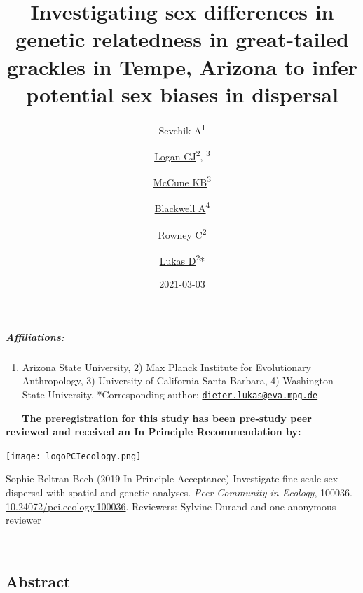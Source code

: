 \documentclass[
]{article}
\title{Investigating sex differences in genetic relatedness in
great-tailed grackles in Tempe, Arizona to infer potential sex biases in
dispersal}
\author{Sevchik
A\textsuperscript{1} \and \href{http://CorinaLogan.com}{Logan
CJ}\textsuperscript{2},
\textsuperscript{3} \and \href{https://www.kelseymccune.com}{McCune
KB}\textsuperscript{3} \and \href{https://blackwell-lab.com}{Blackwell
A}\textsuperscript{4} \and Rowney
C\textsuperscript{2} \and \href{http://dieterlukas.strikingly.com}{Lukas
D}\textsuperscript{2}*}
\date{2021-03-03}
\providecommand{\tightlist}{%
  \setlength{\itemsep}{0pt}\setlength{\parskip}{0pt}}
\begin{document}
\maketitle

\hypertarget{affiliations}{%
\subparagraph{Affiliations:}\label{affiliations}}

\begin{enumerate}
\def\labelenumi{\arabic{enumi})}
\tightlist
\item
  Arizona State University, 2) Max Planck Institute for Evolutionary
  Anthropology, 3) University of California Santa Barbara, 4) Washington
  State University, *Corresponding author:
  \href{mailto:dieter.lukas@eva.mpg.de}{\nolinkurl{dieter.lukas@eva.mpg.de}}
\end{enumerate}

~ ~ \textbf{The preregistration for this study has been pre-study peer
reviewed and received an In Principle Recommendation by:}

\texttt{[image: logoPCIecology.png]}

Sophie Beltran-Bech (2019 In Principle Acceptance) Investigate fine
scale sex dispersal with spatial and genetic analyses. \emph{Peer
Community in Ecology}, 100036.
\href{https://doi.org/10.24072/pci.ecology.100036}{10.24072/pci.ecology.100036}.
Reviewers: Sylvine Durand and one anonymous reviewer

~

\hypertarget{abstract}{%
\subsection{Abstract}\label{abstract}}
\end{document}
